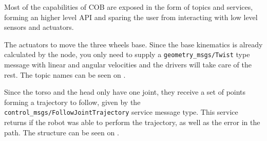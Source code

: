Most of the capabilities of COB are exposed in the form of topics and services, forming an higher level API and sparing the user from interacting with low level sensors and actuators.

The actuators to move the three wheels base. Since the base kinematics is already calculated by the node, you only need to supply a \texttt{geometry\_msgs/Twist} type message with linear and angular velocities and the drivers will take care of the rest. The topic names can be seen on .

\begin{table}[!ht]
\caption{Base command API.} \label{tab:baseapi}
\renewcommand*{\arraystretch}{1.1}
\end{table}

Since the torso and the head only have one joint, they receive a set of points forming a trajectory to follow, given by the \texttt{control\_msgs/FollowJointTrajectory} service message type. This service returns if the robot was able to perform the trajectory, as well as the error in the path. The structure can be seen on .

\begin{table}[!ht]
\caption{Torso and head command API.} \label{tab:headapi}
\renewcommand*{\arraystretch}{1.1}
\end{table}

